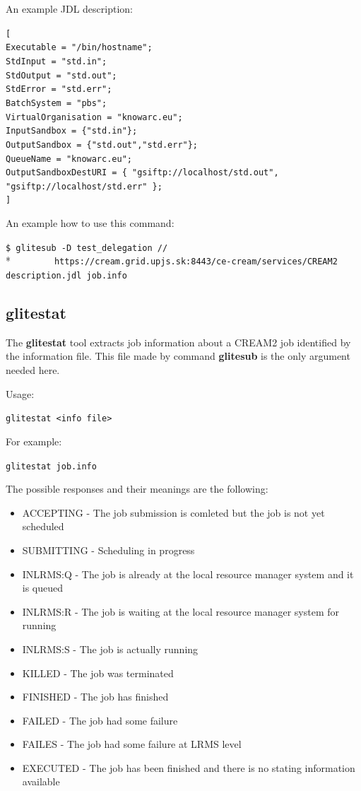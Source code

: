 \documentclass{article}
\begin{document}
An example JDL description:\\
\begin{minipage}{\textwidth}
\begin{framed}
\verb#[#\\
\verb#Executable = "/bin/hostname";#\\
\verb#StdInput = "std.in";#\\
\verb#StdOutput = "std.out";#\\
\verb#StdError = "std.err";#\\
\verb#BatchSystem = "pbs";#\\
\verb#VirtualOrganisation = "knowarc.eu";#\\
\verb#InputSandbox = {"std.in"};#\\
\verb#OutputSandbox = {"std.out","std.err"};#\\
\verb#QueueName = "knowarc.eu";#\\
\verb#OutputSandboxDestURI = { "gsiftp://localhost/std.out", "gsiftp://localhost/std.err" };#\\
\verb#]#
\end{framed}
\end{minipage}
An example how to use this command:
\begin{shaded}\verb#$ glitesub -D test_delegation //#\\*
\verb#        https://cream.grid.upjs.sk:8443/ce-cream/services/CREAM2 description.jdl job.info#\end{shaded}
\subsection{glitestat}
\label{glitestat}
The \textbf{glitestat} tool extracts job information about a CREAM2 job identified by the information file. This file made by command \textbf{glitesub} is the only argument needed here.\par
Usage:
\begin{shaded}\verb#glitestat <info file>#\end{shaded}
For example:
\begin{shaded}\verb#glitestat job.info#\end{shaded}
The possible responses and their meanings are the following:
\begin{itemize}
\item ACCEPTING - The job submission is comleted but the job is not yet scheduled
\item SUBMITTING - Scheduling in progress
\item INLRMS:Q - The job is already at the local resource manager system and it is queued
\item INLRMS:R - The job is waiting at the local resource manager system for running
\item INLRMS:S - The job is actually running
\item KILLED - The job was terminated
\item FINISHED - The job has finished
\item FAILED - The job had some failure
\item FAILES - The job had some failure at LRMS level
\item EXECUTED - The job has been finished and there is no stating information available
\end{itemize}
\end{document}
